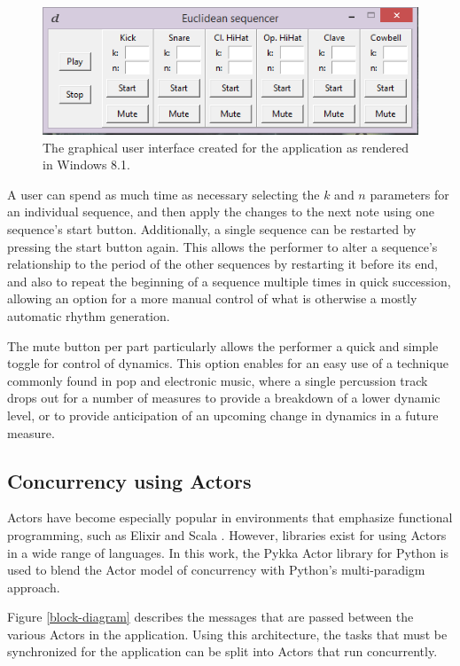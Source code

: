 \documentclass{sig-alternate-05-2015}
\begin{document}
\begin{figure}
\centering
\includegraphics[width=\linewidth]{figs/gui.png}
\caption{The graphical user interface created for the application as rendered in Windows 8.1.}
\label{gui}
\end{figure}

A user can spend as much time as necessary selecting the $k$ and $n$ parameters for an individual sequence, and then apply the changes to the next note using one sequence's start button. Additionally, a single sequence can be restarted by pressing the start button again. This allows the performer to alter a sequence's relationship to the period of the other sequences by restarting it before its end, and also to repeat the beginning of a sequence multiple times in quick succession, allowing an option for a more manual control of what is otherwise a mostly automatic rhythm generation.

The mute button per part particularly allows the performer a quick and simple toggle for control of dynamics. This option enables for an easy use of a technique commonly found in pop and electronic music, where a single percussion track drops out for a number of measures to provide a breakdown of a lower dynamic level, or to provide anticipation of an upcoming change in dynamics in a future measure. 

\subsection{Concurrency using Actors}
Actors have become especially popular in environments that emphasize functional programming, such as Elixir and Scala \cite{karmani2009actor}. However, libraries exist for using Actors in a wide range of languages. In this work, the Pykka Actor library for Python is used to blend the Actor model of concurrency with Python's multi-paradigm approach.

Figure \ref{block-diagram} describes the messages that are passed between the various Actors in the application. Using this architecture, the tasks that must be synchronized for the application can be split into Actors that run concurrently. 
\end{document}

